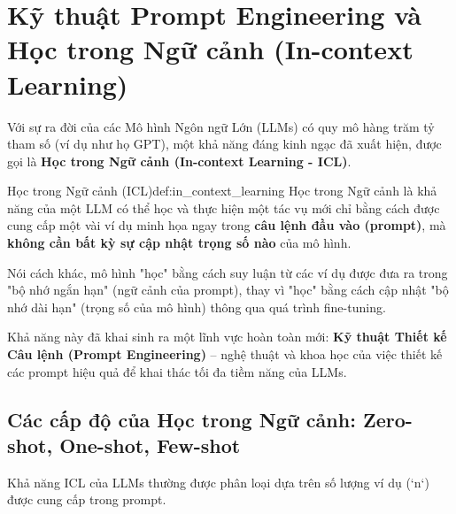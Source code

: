 
\section{Kỹ thuật Prompt Engineering và Học trong Ngữ cảnh (In-context Learning)}
\label{sec:prompt_engineering_icl}

Với sự ra đời của các Mô hình Ngôn ngữ Lớn (LLMs) có quy mô hàng trăm tỷ tham số (ví dụ như họ GPT), một khả năng đáng kinh ngạc đã xuất hiện, được gọi là \textbf{Học trong Ngữ cảnh (In-context Learning - ICL)}.

\begin{definition}{Học trong Ngữ cảnh (ICL)}{def:in_context_learning}
    Học trong Ngữ cảnh là khả năng của một LLM có thể học và thực hiện một tác vụ mới chỉ bằng cách được cung cấp một vài ví dụ minh họa ngay trong \textbf{câu lệnh đầu vào (prompt)}, mà \textbf{không cần bất kỳ sự cập nhật trọng số nào} của mô hình.
\end{definition}

Nói cách khác, mô hình "học" bằng cách suy luận từ các ví dụ được đưa ra trong "bộ nhớ ngắn hạn" (ngữ cảnh của prompt), thay vì "học" bằng cách cập nhật "bộ nhớ dài hạn" (trọng số của mô hình) thông qua quá trình fine-tuning.

Khả năng này đã khai sinh ra một lĩnh vực hoàn toàn mới: \textbf{Kỹ thuật Thiết kế Câu lệnh (Prompt Engineering)} -- nghệ thuật và khoa học của việc thiết kế các prompt hiệu quả để khai thác tối đa tiềm năng của LLMs.

\subsection{Các cấp độ của Học trong Ngữ cảnh: Zero-shot, One-shot, Few-shot}
\label{ssec:shot_learning}

Khả năng ICL của LLMs thường được phân loại dựa trên số lượng ví dụ (`n`) được cung cấp trong prompt.

